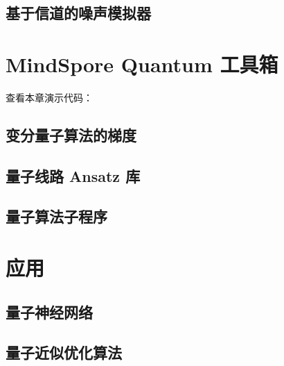 \documentclass[pra,twocolumn,superscriptaddress,floatfix,nofootinbib,amsmath,amssymb]{revtex4-1}
\numberwithin{equation}{section}
\numberwithin{figure}{section}
\numberwithin{table}{section}
\begin{document}
\subsection{基于信道的噪声模拟器}


\section{MindSpore Quantum 工具箱}
\label{sec:toolbox}

查看本章演示代码： \ 

\subsection{变分量子算法的梯度}


\subsection{量子线路 Ansatz 库}


\subsection{量子算法子程序}



\section{应用}
\label{sec:applications}
\subsection{量子神经网络}








\subsection{量子近似优化算法}

\end{document}

